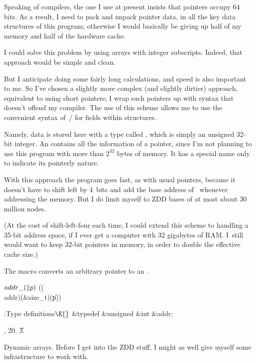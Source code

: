 Speaking of compilers, the one I use at present insists that
pointers occupy 64 bits. As a result, I need to pack and unpack
pointer data, in all the key data structures of this program;
otherwise I would basically be giving up half of my memory and half
of the hardware cache.

I could solve this problem by using arrays with integer subscripts.
Indeed, that approach would be simple and clean.

But I anticipate doing some fairly long calculations, and
speed is also important to me. So I've chosen a slightly more
complex (and slightly dirtier) approach, equivalent to using
short pointers; I wrap such pointers up with syntax that doesn't
offend my compiler. The use of this scheme allows me to use
the convenient syntax of~\CEE/ for fields within structures.

Namely, data is stored here with a type called , which is simply
an unsigned 32-bit integer. An  contains
all the information of a pointer, since I'm not planning to use
this program with more than $2^{32}$ bytes of memory.
It has a special name only to indicate its pointerly nature.

With this approach the program goes fast, as with usual pointers,
because it doesn't have to shift left by 4~bits and add the base
address of~ whenever addressing the memory. But I do limit
myself to ZDD bases of at most about 30 million nodes.

(At the cost of shift-left-four each time, I could extend this
scheme to handling a 35-bit address space, if I ever get a
computer with 32 gigabytes of RAM. I~still would want to keep
32-bit pointers in memory, in order to double the effective cache size.)

The  macro converts an arbitrary pointer to an .

\Y\B\4\D$\\{addr\_}(\|p)$ \5
((\\{addr})(\&{size\_t})(\|p))\par
\Y\B\4:Type definitions\X${}\E{}$\6
\&{typedef} \&{unsigned} \&{int} \&{addr};\par
{}, 20.
\U3.\fi

Dynamic arrays. Before I get into the ZDD stuff, I might
as well
give myself some infrastructure to work with.

